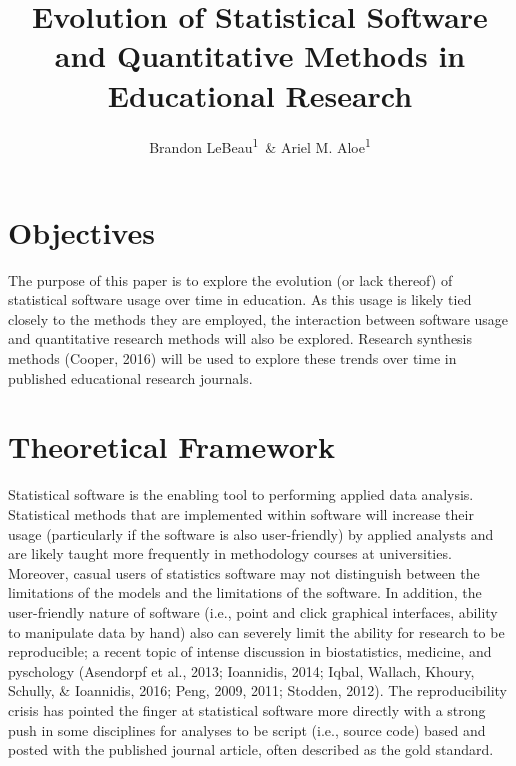 \documentclass[english,man]{apa6}
\title{Evolution of Statistical Software and Quantitative Methods in
Educational Research}
\author{Brandon LeBeau\textsuperscript{1}~\& Ariel M. Aloe\textsuperscript{1}}
\affiliation{
    \vspace{0.5cm}
          \textsuperscript{1} University of Iowa  }
\theoremstyle{definition}
\theoremstyle{definition}
\theoremstyle{remark}
\begin{document}
\maketitle

\setcounter{secnumdepth}{0}



\section{Objectives}\label{objectives}

The purpose of this paper is to explore the evolution (or lack thereof)
of statistical software usage over time in education. As this usage is
likely tied closely to the methods they are employed, the interaction
between software usage and quantitative research methods will also be
explored. Research synthesis methods (Cooper, 2016) will be used to
explore these trends over time in published educational research
journals.

\section{Theoretical Framework}\label{theoretical-framework}

Statistical software is the enabling tool to performing applied data
analysis. Statistical methods that are implemented within software will
increase their usage (particularly if the software is also
user-friendly) by applied analysts and are likely taught more frequently
in methodology courses at universities. Moreover, casual users of
statistics software may not distinguish between the limitations of the
models and the limitations of the software. In addition, the
user-friendly nature of software (i.e., point and click graphical
interfaces, ability to manipulate data by hand) also can severely limit
the ability for research to be reproducible; a recent topic of intense
discussion in biostatistics, medicine, and pyschology (Asendorpf et al.,
2013; Ioannidis, 2014; Iqbal, Wallach, Khoury, Schully, \& Ioannidis,
2016; Peng, 2009, 2011; Stodden, 2012). The reproducibility crisis has
pointed the finger at statistical software more directly with a strong
push in some disciplines for analyses to be script (i.e., source code)
based and posted with the published journal article, often described as
the gold standard.
\end{document}
